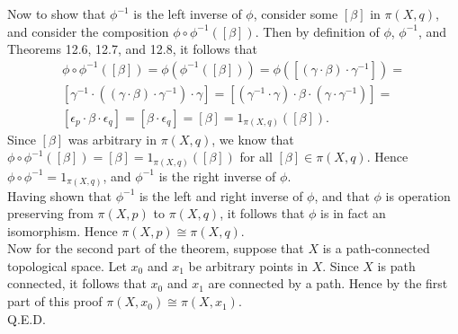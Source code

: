 \documentclass{article}
\newcommand{\inv}[1]{#1^{-1}}
\newcommand{\inv}[1]{#1^{-1}}
\begin{document}
Now to show that $\inv{\phi}$ is the left inverse of $\phi$, consider some $[\beta]$ in $\pi(X,q)$, and consider the composition $\phi\circ\inv{\phi}([\beta])$. Then by definition of $\phi$, $\inv{\phi}$, and Theorems 12.6, 12.7, and 12.8, it follows that
\begin{multline}
   \phi\circ\inv{\phi}([\beta]) = \phi(\inv{\phi}([\beta])) = \phi([(\gamma\cdot \beta)\cdot \inv{\gamma}]) = 
   \\
   [\inv{\gamma}\cdot((\gamma\cdot\beta)\cdot \inv{\gamma})\cdot \gamma] = [(\inv{\gamma}\cdot \gamma)\cdot \beta \cdot (\gamma\cdot \inv{\gamma})] =
   \\ [\epsilon_p\cdot \beta\cdot \epsilon_q] = [\beta\cdot \epsilon_q] = [\beta] = 1_{\pi(X,q)}([\beta]).
\end{multline}
Since $[\beta]$ was arbitrary in $\pi(X,q)$, we know that $\phi\circ \inv{\phi}([\beta]) = [\beta] = 1_{\pi(X,q)}([\beta])$ for all $[\beta]\in \pi(X,q)$. Hence $ \phi\circ \inv{\phi} = 1_{\pi(X,q)}$, and $\inv{\phi}$ is the right inverse of $\phi$.\\

Having shown that $\inv{\phi}$ is the left and right inverse of $\phi$, and that $\phi$ is operation preserving from $\pi(X,p)$ to $\pi(X,q)$, it follows that $\phi$ is in fact an isomorphism. Hence $\pi(X,p)\cong\pi(X,q)$.\\

Now for the second part of the theorem, suppose that $X$ is a path-connected topological space. Let $x_0$ and $x_1$ be arbitrary points in $X$. Since $X$ is path connected, it follows that $x_0$ and $x_1$ are connected by a path. Hence by the first part of this proof $\pi(X,x_0)\cong\pi(X,x_1)$.\\
Q.E.D.
\end{document}
